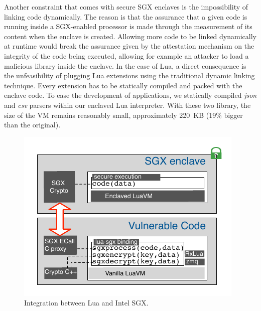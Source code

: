 Another constraint that comes with secure SGX enclaves is the impossibility of linking code dynamically. 
The reason is that the assurance that a given code is running inside a SGX-enabled processor is made through the measurement of its content when the enclave is created.
Allowing more code to be linked dynamically at runtime would break the assurance given by the attestation mechanism on the integrity of the code being executed, allowing for example an attacker to load a malicious library inside the enclave.
In the case of Lua, a direct consequence is the unfeasibility of plugging Lua extensions using the traditional dynamic linking technique. 
Every extension has to be statically compiled and packed with the enclave code. 
To ease the development of \SYS applications, we statically compiled \emph{json} \cite{rfc7159} and \emph{csv}\cite{rfc4180} parsers within our enclaved Lua interpreter.
With these two library, the size of the VM remains reasonably small, approximately 220~KB (19\% bigger than the original).

\begin{figure}[t!]
  \centering
  \includegraphics[scale=0.85]{images/arch-sgxlua.pdf}
  \caption{Integration between Lua and Intel SGX.}
  \label{fig:arch-luasgx}
\end{figure}


